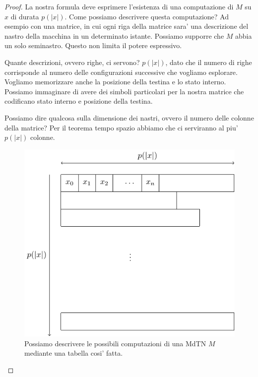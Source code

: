 \begin{proof}
    La nostra formula deve esprimere l'esistenza di una computazione di $M$ su $x$ di durata
    $p(|x|)$. Come possiamo descrivere questa computazione? Ad esempio con una matrice, in cui ogni
    riga della matrice sara' una descrizione del nastro della macchina in un determinato istante.
    Possiamo supporre che $M$ abbia un solo seminastro. Questo non limita il potere espressivo.

    Quante descrizioni, ovvero righe, ci servono? $p(|x|)$, dato che il numero di righe corrisponde
    al numero delle configurazioni successive che vogliamo esplorare. Vogliamo memorizzare anche la
    posizione della testina e lo stato interno. Possiamo immaginare di avere dei simboli particolari
    per la nostra matrice che codificano stato interno e posizione della testina.

    Possiamo dire qualcosa sulla dimensione dei nastri, ovvero il numero delle colonne della
    matrice?  Per il teorema tempo spazio abbiamo che ci serviranno al piu' $p(|x|)$ colonne.

    \begin{figure}[h]
        \begin{center}
            \includegraphics{./img/nondeterminism/SATproof1.pdf}
            \caption{Possiamo descrivere le possibili computazioni di una MdTN $M$ mediante una
            tabella cosi' fatta.}
        \end{center}
    \end{figure}


\end{proof}
